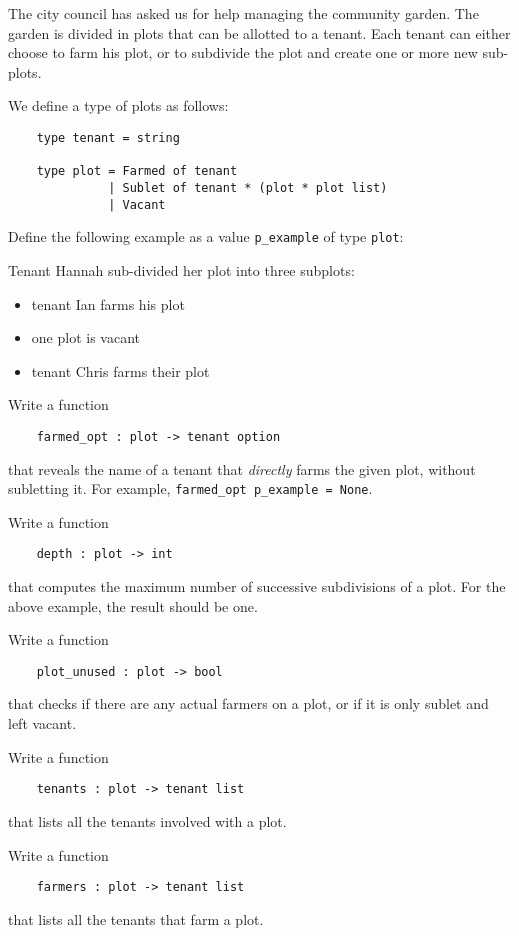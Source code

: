 \documentclass[arhiv]{../izpit}
\begin{document}
\naloga
The city council has asked us for help managing the community garden. The garden is divided in plots that can be allotted to a tenant. Each tenant can either choose to farm his plot, or to subdivide the plot and create one or more new sub-plots.

We define a type of plots as follows:
\begin{verbatim}
    type tenant = string

    type plot = Farmed of tenant
              | Sublet of tenant * (plot * plot list)
              | Vacant
\end{verbatim}

\podnaloga
Define the following example as a value \verb|p_example| of type \verb|plot|:

Tenant Hannah sub-divided her plot into three subplots:
\begin{itemize}[noitemsep]
\item tenant Ian farms his plot
\item one plot is vacant
\item tenant Chris farms their plot
\end{itemize}

\podnaloga
Write a function
\begin{verbatim}
    farmed_opt : plot -> tenant option
\end{verbatim}
that reveals the name of a tenant that \emph{directly} farms the given plot, without subletting it. For example, \verb|farmed_opt p_example = None|.

\podnaloga
Write a function
\begin{verbatim}
    depth : plot -> int
\end{verbatim}
that computes the maximum number of successive subdivisions of a plot. For the above example, the result should be one.

\podnaloga
Write a function
\begin{verbatim}
    plot_unused : plot -> bool
\end{verbatim}
that checks if there are any actual farmers on a plot, or if it is only sublet and left vacant.

\podnaloga
Write a function
\begin{verbatim}
    tenants : plot -> tenant list
\end{verbatim}
that lists all the tenants involved with a plot.

\podnaloga
Write a function
\begin{verbatim}
    farmers : plot -> tenant list
\end{verbatim}
that lists all the tenants that farm a plot.
\end{document}
